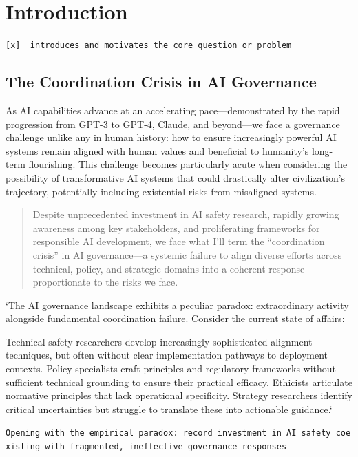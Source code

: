 \documentclass[12pt,a4paper]{report}
\begin{document}

\chapter{Introduction}\label{sec-introduction}

\texttt{{[}x{]}\ \ introduces\ and\ motivates\ the\ core\ question\ or\ problem}

\section{The Coordination Crisis in AI
Governance}\label{sec-coordination-crisis}

As AI capabilities advance at an accelerating pace---demonstrated by the
rapid progression from GPT-3 to GPT-4, Claude, and beyond---we face a
governance challenge unlike any in human history: how to ensure
increasingly powerful AI systems remain aligned with human values and
beneficial to humanity's long-term flourishing. This challenge becomes
particularly acute when considering the possibility of transformative AI
systems that could drastically alter civilization's trajectory,
potentially including existential risks from misaligned systems.

\begin{quote}
Despite unprecedented investment in AI safety research, rapidly growing
awareness among key stakeholders, and proliferating frameworks for
responsible AI development, we face what I'll term the ``coordination
crisis'' in AI governance---a systemic failure to align diverse efforts
across technical, policy, and strategic domains into a coherent response
proportionate to the risks we face.
\end{quote}

`The AI governance landscape exhibits a peculiar paradox: extraordinary
activity alongside fundamental coordination failure. Consider the
current state of affairs:

Technical safety researchers develop increasingly sophisticated
alignment techniques, but often without clear implementation pathways to
deployment contexts. Policy specialists craft principles and regulatory
frameworks without sufficient technical grounding to ensure their
practical efficacy. Ethicists articulate normative principles that lack
operational specificity. Strategy researchers identify critical
uncertainties but struggle to translate these into actionable guidance.`

\texttt{Opening\ with\ the\ empirical\ paradox:\ record\ investment\ in\ AI\ safety\ coexisting\ with\ fragmented,\ ineffective\ governance\ responses}
\end{document}
